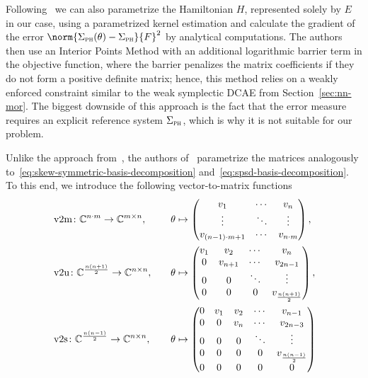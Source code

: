 Following~\cite{Najnudel2021} we can also parametrize the Hamiltonian $H$, represented solely by $E$ in our case, using a parametrized kernel estimation and calculate the gradient of the error $\norm{\Sigma_\msc{ph}(\theta) - \Sigma_\msc{ph}}{F}^2$ by analytical computations.
The authors then use an Interior Points Method with an additional logarithmic barrier term in the objective function, where the barrier penalizes the matrix coefficients if they do not form a positive definite matrix; hence, this method relies on a weakly enforced constraint similar to the weak symplectic \ac{DCAE} from Section~\ref{sec:nn-mor}.
The biggest downside of this approach is the fact that the error measure requires an explicit reference system $\Sigma_{\textnormal{\scshape ph}}$, which is why it is not suitable for our problem.

Unlike the approach from~\cite{Najnudel2021}, the authors of~\cite{Schwerdtner2021, SV2021, Schwerdtner2023, SV2023} parametrize the matrices analogously to~\eqref{eq:skew-symmetric-basis-decomposition} and~\eqref{eq:spsd-basis-decomposition}.
To this end, we introduce the following vector-to-matrix functions
\begin{alignat}{4}
    &\mathop{}\!\mathrm{v}2\mathrm{m} \colon \mathbb{C}^{n \cdot m} \to \mathbb{C}^{m \times n},\quad &&\theta \mapsto \begin{pmatrix}
        v_1 & \cdots & v_n \\
        \vdots & \ddots & \vdots \\
        v_{(n - 1) \cdot m + 1} & \cdots & v_{n \cdot m}
    \end{pmatrix}, \label{eq:v2m}\\
    &\mathop{}\!\mathrm{v}2\mathrm{u} \colon \mathbb{C}^{\frac{n (n + 1)}{2}} \to \mathbb{C}^{n \times n},\quad &&\theta \mapsto \begin{pmatrix}
        v_1 & v_2 & \cdots & v_n \\
        0 & v_{n + 1} & \cdots & v_{2n - 1} \\
        0 & 0 & \ddots & \vdots \\
        0 & 0 & 0 & v_{\frac{n (n + 1)}{2}}
    \end{pmatrix}, \label{eq:v2u}\\
    &\mathop{}\!\mathrm{v}2\mathrm{s} \colon \mathbb{C}^{\frac{n (n - 1)}{2}} \to \mathbb{C}^{n \times n},\quad &&\theta \mapsto \begin{pmatrix}
        0 & v_1 & v_2 & \cdots & v_{n - 1} \\
        0 & 0 & v_n & \cdots & v_{2n - 3} \\
        0 & 0 & 0 & \ddots & \vdots \\
        0 & 0 & 0 & 0 & v_{\frac{n (n - 1)}{2}} \\
        0 & 0 & 0 & 0 & 0
    \end{pmatrix} \label{eq:v2s}
\end{alignat}
